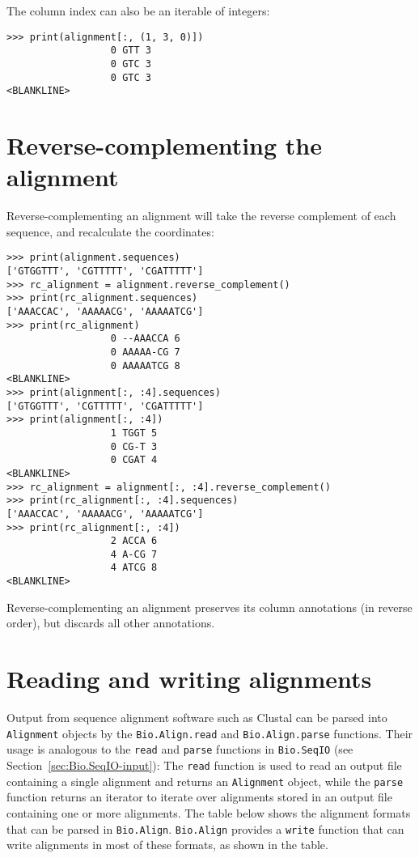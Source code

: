 The column index can also be an iterable of integers:
\begin{verbatim}
>>> print(alignment[:, (1, 3, 0)])
                  0 GTT 3
                  0 GTC 3
                  0 GTC 3
<BLANKLINE>
\end{verbatim}

\section{Reverse-complementing the alignment}

Reverse-complementing an alignment will take the reverse complement of each sequence, and recalculate the coordinates:
\begin{verbatim}
>>> print(alignment.sequences)
['GTGGTTT', 'CGTTTTT', 'CGATTTTT']
>>> rc_alignment = alignment.reverse_complement()
>>> print(rc_alignment.sequences)
['AAACCAC', 'AAAAACG', 'AAAAATCG']
>>> print(rc_alignment)
                  0 --AAACCA 6
                  0 AAAAA-CG 7
                  0 AAAAATCG 8
<BLANKLINE>
>>> print(alignment[:, :4].sequences)
['GTGGTTT', 'CGTTTTT', 'CGATTTTT']
>>> print(alignment[:, :4])
                  1 TGGT 5
                  0 CG-T 3
                  0 CGAT 4
<BLANKLINE>
>>> rc_alignment = alignment[:, :4].reverse_complement()
>>> print(rc_alignment[:, :4].sequences)
['AAACCAC', 'AAAAACG', 'AAAAATCG']
>>> print(rc_alignment[:, :4])
                  2 ACCA 6
                  4 A-CG 7
                  4 ATCG 8
<BLANKLINE>
\end{verbatim}
Reverse-complementing an alignment preserves its column annotations (in reverse order), but discards all other annotations.

\section{Reading and writing alignments}
\label{sec:alignmentparsers}

Output from sequence alignment software such as Clustal can be parsed into \verb|Alignment| objects by the \verb|Bio.Align.read| and \verb|Bio.Align.parse| functions. Their usage is analogous to the \verb|read| and \verb|parse| functions in \verb|Bio.SeqIO| (see Section~\ref{sec:Bio.SeqIO-input}): The \verb|read| function is used to read an output file containing a single alignment and returns an \verb|Alignment| object, while the \verb|parse| function returns an iterator to iterate over alignments stored in an output file containing one or more alignments. The table below shows the alignment formats that can be parsed in \verb|Bio.Align|. \verb|Bio.Align| provides a \verb|write| function that can write alignments in most of these formats, as shown in the table.


